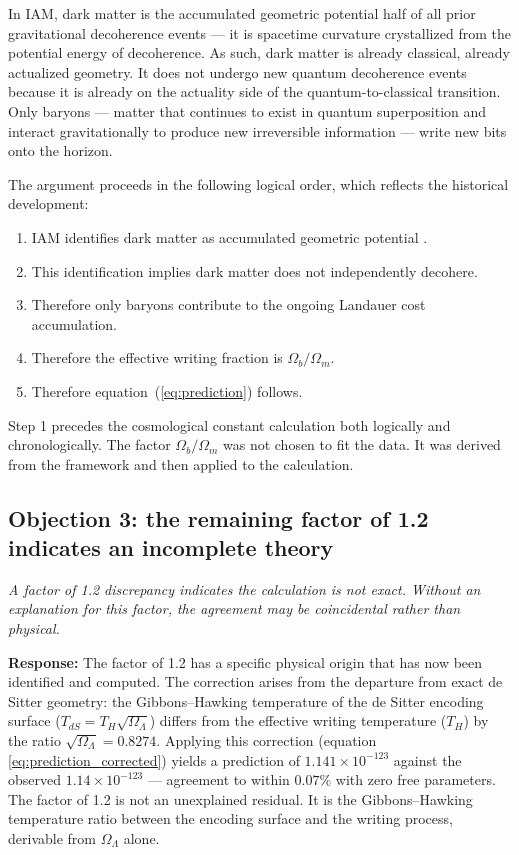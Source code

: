 \documentclass[12pt,a4paper]{article}
\begin{document}
In IAM, dark matter is the accumulated geometric potential half of all
prior gravitational decoherence events — it is spacetime curvature
crystallized from the potential energy of decoherence. As such, dark
matter is already classical, already actualized geometry. It does not
undergo new quantum decoherence events because it is already on the
actuality side of the quantum-to-classical transition. Only baryons —
matter that continues to exist in quantum superposition and interact
gravitationally to produce new irreversible information — write new bits
onto the horizon.

The argument proceeds in the following logical order, which reflects the
historical development:
\begin{enumerate}
\item IAM identifies dark matter as accumulated geometric potential
\citep{mahaffey2026_virial_dm}.
\item This identification implies dark matter does not independently
decohere.
\item Therefore only baryons contribute to the ongoing Landauer cost
accumulation.
\item Therefore the effective writing fraction is $\Omega_b/\Omega_m$.
\item Therefore equation~(\ref{eq:prediction}) follows.
\end{enumerate}

Step 1 precedes the cosmological constant calculation both logically and
chronologically. The factor $\Omega_b/\Omega_m$ was not chosen to fit the
data. It was derived from the framework and then applied to the
calculation.

\subsection{Objection 3: the remaining factor of 1.2 indicates an
incomplete theory}

\textit{A factor of 1.2 discrepancy indicates the calculation is not
exact. Without an explanation for this factor, the agreement may be
coincidental rather than physical.}

\textbf{Response:} The factor of 1.2 has a specific physical origin that
has now been identified and computed. The correction arises from the
departure from exact de Sitter geometry: the Gibbons--Hawking temperature
of the de Sitter encoding surface ($T_{dS} = T_H\sqrt{\Omega_\Lambda}$)
differs from the effective writing temperature ($T_H$) by the ratio
$\sqrt{\Omega_\Lambda} = 0.8274$. Applying this correction (equation
\ref{eq:prediction_corrected}) yields a prediction of
$1.141 \times 10^{-123}$ against the observed $1.14 \times 10^{-123}$
— agreement to within $0.07\%$ with zero free parameters. The factor of
1.2 is not an unexplained residual. It is the Gibbons--Hawking temperature
ratio between the encoding surface and the writing process, derivable
from $\Omega_\Lambda$ alone.
\end{document}
